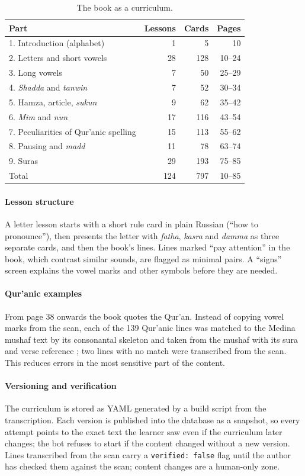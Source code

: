 \begin{table}[ht]
\centering\small
\caption{The book as a curriculum.}
\label{tab:book}
\begin{tabular}{@{}lrrr@{}}
\toprule
Part & Lessons & Cards & Pages \\
\midrule
1. Introduction (alphabet) & 1 & 5 & 10 \\
2. Letters and short vowels & 28 & 128 & 10--24 \\
3. Long vowels & 7 & 50 & 25--29 \\
4. \emph{Shadda} and \emph{tanwin} & 7 & 52 & 30--34 \\
5. Hamza, article, \emph{sukun} & 9 & 62 & 35--42 \\
6. \emph{Mim} and \emph{nun} & 17 & 116 & 43--54 \\
7. Peculiarities of Qur'anic spelling & 15 & 113 & 55--62 \\
8. Pausing and \emph{madd} & 11 & 78 & 63--74 \\
9. Suras & 29 & 193 & 75--85 \\
\midrule
Total & 124 & 797 & 10--85 \\
\bottomrule
\end{tabular}
\end{table}

\paragraph{Lesson structure} A letter lesson starts with a short rule card in plain Russian (``how to
pronounce''), then presents the letter with \emph{fatha}, \emph{kasra} and \emph{damma} as three separate
cards, and then the book's lines. Lines marked ``pay attention'' in the book, which contrast similar
sounds, are flagged as minimal pairs. A ``signs'' screen explains the vowel marks and other symbols before
they are needed.

\paragraph{Qur'anic examples} From page 38 onwards the book quotes the Qur'an. Instead of copying vowel
marks from the scan, each of the 139 Qur'anic lines was matched to the Medina mushaf text by its consonantal
skeleton and taken from the mushaf with its sura and verse reference \cite{SRC-041}; two lines with no match
were transcribed from the scan. This reduces errors in the most sensitive part of the content.

\paragraph{Versioning and verification} The curriculum is stored as YAML generated by a build script from the
transcription. Each version is published into the database as a snapshot, so every attempt points to the
exact text the learner saw even if the curriculum later changes; the bot refuses to start if the content
changed without a new version. Lines transcribed from the scan carry a \texttt{verified: false} flag until the
author has checked them against the scan; content changes are a human-only zone.

